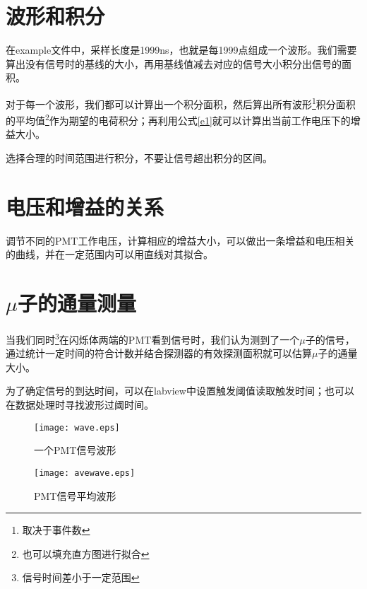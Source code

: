 \documentclass{elegantbook}
\begin{document}
\section{波形和积分}
在example文件中，采样长度是1999ns，也就是每1999点组成一个波形。我们需要算出没有信号时的基线的大小，再用基线值减去对应的信号大小积分出信号的面积。

对于每一个波形，我们都可以计算出一个积分面积，然后算出所有波形\footnote{取决于事件数}积分面积的平均值\footnote{也可以填充直方图进行拟合}作为期望的电荷积分；再利用公式\ref{e1}就可以计算出当前工作电压下的增益大小。
\begin{note}
选择合理的时间范围进行积分，不要让信号超出积分的区间。
\end{note}
\section{电压和增益的关系}
调节不同的PMT工作电压，计算相应的增益大小，可以做出一条增益和电压相关的曲线，并在一定范围内可以用直线对其拟合。
\section{$\mu$子的通量测量}
当我们同时\footnote{信号时间差小于一定范围}在闪烁体两端的PMT看到信号时，我们认为测到了一个$\mu$子的信号，通过统计一定时间的符合计数并结合探测器的有效探测面积就可以估算$\mu$子的通量大小。

为了确定信号的到达时间，可以在labview中设置触发阈值读取触发时间；也可以在数据处理时寻找波形过阈时间。
\begin{figure}[!htbp]
	\centering
	\texttt{[image: wave.eps]}
	\caption{一个PMT信号波形\label{fig:wave}}
\end{figure}
\begin{figure}[!htbp]
	\centering
	\texttt{[image: avewave.eps]}
	\caption{PMT信号平均波形\label{fig:avewave}}
\end{figure}
%
%
%
\end{document}

